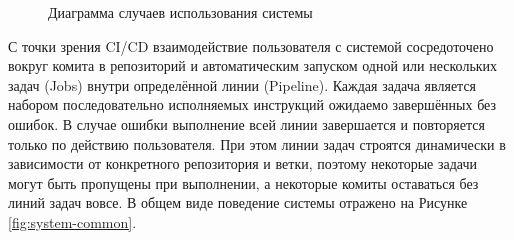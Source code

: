 \begin{figure}[h!]
    \centering
    \caption{Диаграмма случаев использования системы}
    \label{fig:use-cases}
\end{figure}

С точки зрения CI/CD взаимодействие пользователя с системой сосредоточено вокруг комита в репозиторий и автоматическим запуском
одной или нескольких задач (Jobs) внутри определённой линии (Pipeline).
Каждая задача является набором последовательно исполняемых инструкций ожидаемо завершённых без ошибок.
В случае ошибки выполнение всей линии завершается и повторяется только по действию пользователя.
При этом линии задач строятся динамически в зависимости от конкретного репозитория и ветки, поэтому некоторые задачи могут быть пропущены при выполнении,
а некоторые комиты оставаться без линий задач вовсе.
В общем виде поведение системы отражено на Рисунке \ref{fig:system-common}.

